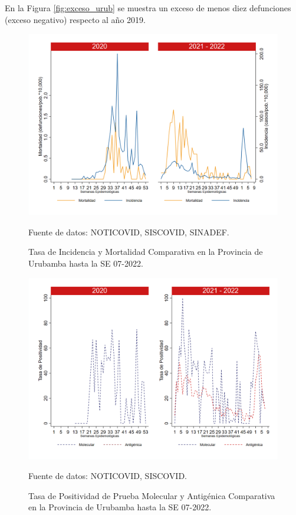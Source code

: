 \documentclass[12pt,a4paper,openany]{book}
\begin{document}
		En la Figura \ref{fig:exceso_urub} se muestra un exceso de menos diez defunciones (exceso negativo) respecto al año 2019.
		
		\begin{figure}[h]
			\caption{Tasa de Incidencia y Mortalidad Comparativa en la Provincia de Urubamba hasta la SE 07-2022.}\label{fig:inc_urub}
			\begin{center}
				\includegraphics[width=0.7\linewidth]{../figuras/incidencia_mortalidad_20_21_13.png}
			\end{center}
			{\footnotesize {Fuente de datos: NOTICOVID, SISCOVID, SINADEF.}}
		\end{figure}
		
		\begin{figure}[h]
			\caption{Tasa de Positividad de Prueba Molecular y Antigénica Comparativa en la Provincia de Urubamba hasta la SE 07-2022.}\label{fig:positividad_urub}
			\begin{center}
				\includegraphics[width=0.7\linewidth]{../figuras/positividad_20_21_13.png}
			\end{center}
			{\footnotesize {Fuente de datos: NOTICOVID, SISCOVID.}}
		\end{figure}
		
\end{document}
